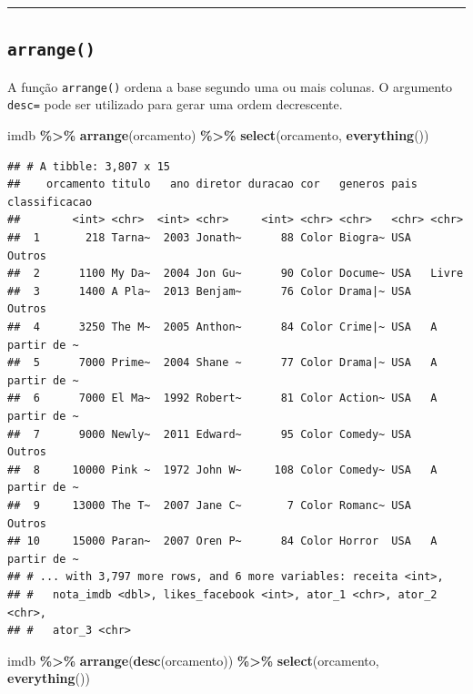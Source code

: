 \documentclass[
]{book}
\newenvironment{Shaded}{\begin{snugshade}}{\end{snugshade}}
\newcommand{\KeywordTok}[1]{\textcolor[rgb]{0.13,0.29,0.53}{\textbf{#1}}}
\newcommand{\NormalTok}[1]{#1}
\newcommand{\OperatorTok}[1]{\textcolor[rgb]{0.81,0.36,0.00}{\textbf{#1}}}
\newcommand{\StringTok}[1]{\textcolor[rgb]{0.31,0.60,0.02}{#1}}
\begin{document}
\begin{center}\rule{0.5\linewidth}{0.5pt}\end{center}

\hypertarget{arrange}{%
\subsection{\texorpdfstring{\texttt{arrange()}}{arrange()}}\label{arrange}}

A função \texttt{arrange()} ordena a base segundo uma ou mais colunas. O argumento \texttt{desc=} pode ser utilizado para gerar uma ordem decrescente.

\begin{Shaded}
\begin{Highlighting}[]
\NormalTok{imdb }\OperatorTok{\%>\%}
\StringTok{  }\KeywordTok{arrange}\NormalTok{(orcamento) }\OperatorTok{\%>\%}
\StringTok{  }\KeywordTok{select}\NormalTok{(orcamento, }\KeywordTok{everything}\NormalTok{())}
\end{Highlighting}
\end{Shaded}

\begin{verbatim}
## # A tibble: 3,807 x 15
##    orcamento titulo   ano diretor duracao cor   generos pais  classificacao
##        <int> <chr>  <int> <chr>     <int> <chr> <chr>   <chr> <chr>        
##  1       218 Tarna~  2003 Jonath~      88 Color Biogra~ USA   Outros       
##  2      1100 My Da~  2004 Jon Gu~      90 Color Docume~ USA   Livre        
##  3      1400 A Pla~  2013 Benjam~      76 Color Drama|~ USA   Outros       
##  4      3250 The M~  2005 Anthon~      84 Color Crime|~ USA   A partir de ~
##  5      7000 Prime~  2004 Shane ~      77 Color Drama|~ USA   A partir de ~
##  6      7000 El Ma~  1992 Robert~      81 Color Action~ USA   A partir de ~
##  7      9000 Newly~  2011 Edward~      95 Color Comedy~ USA   Outros       
##  8     10000 Pink ~  1972 John W~     108 Color Comedy~ USA   A partir de ~
##  9     13000 The T~  2007 Jane C~       7 Color Romanc~ USA   Outros       
## 10     15000 Paran~  2007 Oren P~      84 Color Horror  USA   A partir de ~
## # ... with 3,797 more rows, and 6 more variables: receita <int>,
## #   nota_imdb <dbl>, likes_facebook <int>, ator_1 <chr>, ator_2 <chr>,
## #   ator_3 <chr>
\end{verbatim}

\begin{Shaded}
\begin{Highlighting}[]
\NormalTok{imdb }\OperatorTok{\%>\%}
\StringTok{  }\KeywordTok{arrange}\NormalTok{(}\KeywordTok{desc}\NormalTok{(orcamento)) }\OperatorTok{\%>\%}
\StringTok{  }\KeywordTok{select}\NormalTok{(orcamento, }\KeywordTok{everything}\NormalTok{())}
\end{Highlighting}
\end{Shaded}
\end{document}
